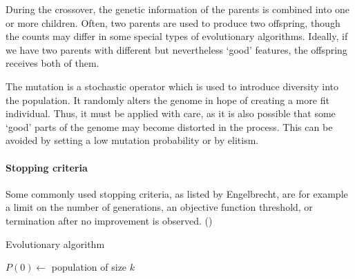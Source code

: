 During the crossover, the genetic information of the parents is combined into
one or more children. Often, two parents are used to produce two
offspring, though the counts may differ in some special types of evolutionary
algorithms. Ideally, if we have two parents with different but nevertheless
`good' features, the offspring receives both of them.
\citep{Eiben:2015:IEC:2810085}

The mutation is a stochastic operator which is used to introduce diversity into
the population. It randomly alters the genome in hope of creating a more
fit individual. Thus, it must be applied with care, as it is
also possible that some `good' parts of the genome may become distorted in the
process. This can be avoided by setting a low mutation probability or by
elitism.

\paragraph{Stopping criteria}
Some commonly used stopping criteria, as listed by Engelbrecht, are for example 
a limit on the number of generations, an objective function threshold, or
termination after no improvement is observed.
(\citep{Engelbrecht:2007:CII:1557464})


\begin{algorithm}
\DontPrintSemicolon 
\caption{Evolutionary algorithm\label{alg:EA}}
  \SetNoFillComment
  \;
  $P(0) \longleftarrow$ population of size $k$

  \;
\end{algorithm}

